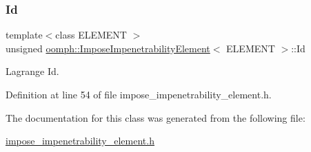 \subsubsection{\texorpdfstring{Id}{Id}}
{\footnotesize\ttfamily template$<$class E\+L\+E\+M\+E\+NT $>$ \\
unsigned \hyperlink{classoomph_1_1ImposeImpenetrabilityElement}{oomph\+::\+Impose\+Impenetrability\+Element}$<$ E\+L\+E\+M\+E\+NT $>$\+::Id\hspace{0.3cm}{\ttfamily [private]}}



Lagrange Id. 



Definition at line 54 of file impose\+\_\+impenetrability\+\_\+element.\+h.



The documentation for this class was generated from the following file\+:\begin{DoxyCompactItemize}
\item 
\hyperlink{impose__impenetrability__element_8h}{impose\+\_\+impenetrability\+\_\+element.\+h}\end{DoxyCompactItemize}
